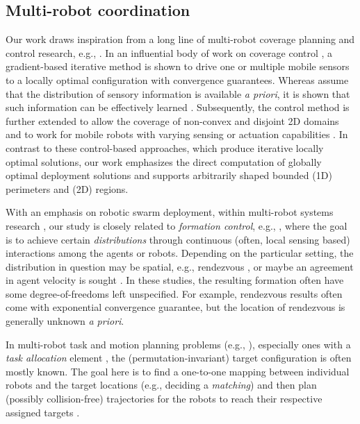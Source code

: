 \subsection{Multi-robot coordination} 
Our work draws inspiration from a long line of multi-robot coverage planning and 
control research, e.g., \cite{cortes2004coverage,martinez2007motion,
schwager2009optimal,pavone2009equitable,schwager2009decentralized,
pierson2017adapting}. 
%
In an influential body of work on coverage control \cite{cortes2004coverage,
martinez2007motion}, a gradient-based iterative method is shown to drive 
one or multiple mobile sensors to a locally optimal configuration with 
convergence guarantees. 
%
Whereas \cite{cortes2004coverage,martinez2007motion} assume that the 
distribution of sensory information is available {\em a priori}, it is 
shown that such information can be effectively learned 
\cite{schwager2009decentralized}. 
%
Subsequently, the control method is further extended to allow the 
coverage of non-convex and disjoint 2D domains \cite{schwager2009optimal} 
and to work for mobile robots with varying sensing or actuation capabilities
\cite{pierson2017adapting}. 
%
In contrast to these control-based approaches, which produce iterative 
locally optimal solutions, our work emphasizes the direct computation of 
globally optimal deployment solutions and supports arbitrarily shaped
bounded (1D) perimeters and (2D) regions.

With an emphasis on robotic swarm deployment, within multi-robot 
systems research \cite{arai2002advances,gerkey2004formal,ren2008distributed,bullo2009distributed}, 
our study is closely related to {\em formation control}, e.g., 
\cite{ando1999distributed,jadbabaie2003coordination,olfati2004consensus,ren2005consensus,cheng2008almost,mesbahi2010graph,yu2012rendezvous},
where the goal is to achieve certain {\em distributions} through 
continuous (often, local sensing based) interactions among the 
agents or robots. Depending on the particular setting, the 
distribution in question may be spatial, e.g., rendezvous
\cite{ando1999distributed,yu2012rendezvous}, or maybe an agreement 
in agent velocity is sought \cite{jadbabaie2003coordination,ren2005consensus}. 
In these studies, the resulting formation often have some 
degree-of-freedoms left unspecified. For example, rendezvous 
results \cite{ando1999distributed,yu2012rendezvous} often come 
with exponential convergence guarantee, but the location of
rendezvous is generally unknown {\em a priori}. 

In multi-robot task and motion planning problems (e.g.,
\cite{smith2009monotonic,ayanian2010decentralized,liu2011multi,liu2013optimal,turpin2014goal,turpin2014capt,alonso2015multi,SolYu15}), 
especially ones with a {\em task allocation} element 
\cite{smith2009monotonic,liu2011multi,liu2013optimal,turpin2014goal,turpin2014capt,SolYu15},
the (permutation-invariant) target configuration is often mostly 
known. The goal here is to find a one-to-one mapping between individual 
robots and the target locations (e.g., deciding a {\em matching}) and 
then plan (possibly collision-free) trajectories for the robots to reach 
their respective assigned targets \cite{turpin2014goal,turpin2014capt,SolYu15}.  


